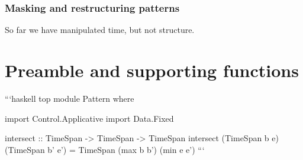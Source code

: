 \documentclass[
]{article}
\newenvironment{Shaded}{}{}
\newcommand{\DataTypeTok}[1]{\textcolor[rgb]{0.56,0.13,0.00}{#1}}
\newcommand{\FunctionTok}[1]{\textcolor[rgb]{0.02,0.16,0.49}{#1}}
\newcommand{\NormalTok}[1]{#1}
\newcommand{\OperatorTok}[1]{\textcolor[rgb]{0.40,0.40,0.40}{#1}}
\newcommand{\OtherTok}[1]{\textcolor[rgb]{0.00,0.44,0.13}{#1}}
\begin{document}
\subsubsection{Masking and restructuring
patterns}\label{masking-and-restructuring-patterns}

So far we have manipulated time, but not structure.

\begin{Shaded}
\end{Shaded}

\appendix

\section{Preamble and supporting
functions}\label{preamble-and-supporting-functions}

```haskell top module Pattern where

import Control.Applicative import Data.Fixed

intersect :: TimeSpan -\textgreater{} TimeSpan -\textgreater{} TimeSpan
intersect (TimeSpan b e) (TimeSpan b' e') = TimeSpan (max b b') (min e
e') ```
\end{document}
